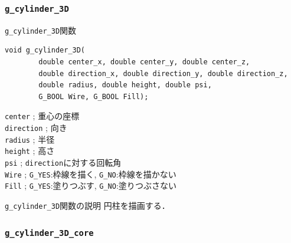 \documentclass[platex,a4paper,12pt]{jsarticle}%
\begin{document}
\clearpage
\subsubsection{\texttt{g\_cylinder\_3D}}

\begin{itembox}[l]{\texttt{g\_cylinder\_3D}関数}
\begin{verbatim}
void g_cylinder_3D(
        double center_x, double center_y, double center_z,
        double direction_x, double direction_y, double direction_z,
        double radius, double height, double psi,
        G_BOOL Wire, G_BOOL Fill);   
\end{verbatim}
\verb|center| ; 重心の座標\\
\verb|direction| ; 向き\\
\verb|radius| ; 半径\\
\verb|height| ; 高さ\\
\verb|psi| ; \verb|direction|に対する回転角\\
\verb|Wire| ; \verb|G_YES|:枠線を描く, \verb|G_NO|:枠線を描かない \\
\verb|Fill| ; \verb|G_YES|:塗りつぶす, \verb|G_NO|:塗りつぶさない
\end{itembox}

\begin{itembox}[l]{\texttt{g\_cylinder\_3D}関数の説明}
円柱を描画する．
\end{itembox}



\clearpage
\subsubsection{\texttt{g\_cylinder\_3D\_core}}
\end{document}
